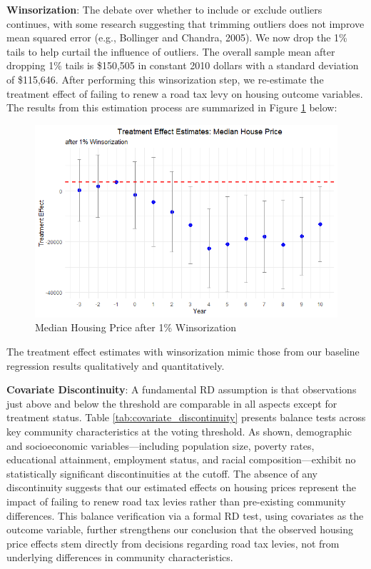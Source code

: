 \textbf{Winsorization}: The debate over whether to include or exclude outliers continues, with some research suggesting that trimming outliers does not improve mean squared error (e.g., Bollinger and Chandra, 2005).  We now drop the 1\% tails to help curtail the influence of outliers. The overall sample mean after dropping 1\% tails is \$150,505 in constant 2010 dollars with a standard deviation of \$115,646. After performing this winsorization step, we re-estimate the treatment effect of failing to renew a road tax levy on housing outcome variables. The results from this estimation process are summarized in Figure \ref{fig:tes_g_w} below:

\begin{figure}[htbp]
    \centering
    \includegraphics[width=\textwidth,keepaspectratio]{images/tes_g_w_reg.png}    
    \caption{Median Housing Price after 1\% Winsorization}
    \label{fig:tes_g_w}
\end{figure}

The treatment effect estimates with winsorization mimic those from our baseline regression results qualitatively and quantitatively.

\textbf{Covariate Discontinuity}: A fundamental RD assumption is that observations just above and below the threshold are comparable in all aspects except for treatment status. Table \ref{tab:covariate_discontinuity} presents balance tests across key community characteristics at the voting threshold. As shown, demographic and socioeconomic variables—including population size, poverty rates, educational attainment, employment status, and racial composition—exhibit no statistically significant discontinuities at the cutoff. The absence of any discontinuity suggests that our estimated effects on housing prices represent the impact of failing to renew road tax levies rather than pre-existing community differences. This balance verification via a formal RD test, using covariates as the outcome variable, further strengthens our conclusion that the observed housing price effects stem directly from decisions regarding road tax levies, not from underlying differences in community characteristics.

